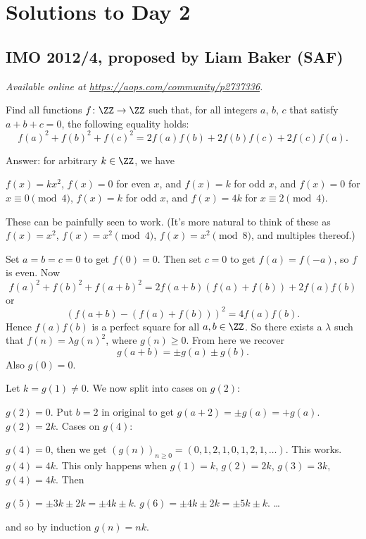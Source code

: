 \documentclass[11pt]{scrartcl}
\begin{document}
\section{Solutions to Day 2}
\subsection{IMO 2012/4, proposed by Liam Baker (SAF)}
\textsl{Available online at \url{https://aops.com/community/p2737336}.}
\begin{mdframed}[style=mdpurplebox,frametitle={Problem statement}]
Find all functions $f \colon \ZZ \to \ZZ$ such that,
for all integers $a$, $b$, $c$ that satisfy $a+b+c=0$,
the following equality holds:
\[ f(a)^2+f(b)^2+f(c)^2 = 2f(a)f(b)+2f(b)f(c)+2f(c)f(a). \]
\end{mdframed}
Answer: for arbitrary $k \in \ZZ$, we have
\begin{enumerate}[(i)]
  \ii $f(x) = kx^2$,
  \ii $f(x) = 0$ for even $x$, and $f(x) = k$ for odd $x$, and
  \ii $f(x) = 0$ for $x \equiv 0 \pmod 4$,
  $f(x) = k$ for odd $x$, and $f(x) = 4k$ for $x \equiv 2 \pmod 4$.
\end{enumerate}
These can be painfully seen to work.
(It's more natural to think of these as
$f(x) = x^2$, $f(x) = x^2 \pmod 4$, $f(x) = x^2 \pmod 8$,
and multiples thereof.)

Set $a=b=c=0$ to get $f(0)=0$.
Then set $c=0$ to get $f(a) = f(-a)$, so $f$ is even.
Now \[ f(a)^2 + f(b)^2 + f(a+b)^2
= 2f(a+b)\left( f(a)+f(b) \right) + 2f(a)f(b) \]
or
\[ \left( f(a+b) - \left( f(a)+f(b) \right) \right)^2
  = 4f(a)f(b). \]
Hence $f(a)f(b)$ is a perfect square for all $a,b \in \ZZ$.
So there exists a $\lambda$ such that $f(n) = \lambda g(n)^2$, where $g(n) \ge 0$.
From here we recover
\[ \boxed{g(a+b) = \pm g(a) \pm g(b)}. \]
Also $g(0) = 0$.

Let $k = g(1) \neq 0$.
We now split into cases on $g(2)$:
\begin{itemize}
  \ii $g(2) = 0$. Put $b = 2$ in original to get
  $g(a+2) = \pm g(a) = +g(a)$.
  \ii $g(2) = 2k$. Cases on $g(4)$:
  \begin{itemize}
    \ii $g(4) = 0$, then we get
    $(g(n))_{n\ge0} = (0,1,2,1,0,1,2,1,\dots)$.  This works.
    \ii $g(4) = 4k$. This only happens when
    $g(1) = k$, $g(2) = 2k$, $g(3) = 3k$, $g(4) = 4k$.
    Then
    \begin{itemize}
      \ii $g(5) = \pm 3k \pm 2k = \pm 4k \pm k$.
      \ii $g(6) = \pm4k \pm 2k = \pm5k \pm k$.
      \ii \dots
    \end{itemize}
    and so by induction $g(n) = nk$.
  \end{itemize}
\end{itemize}
\pagebreak
\end{document}

